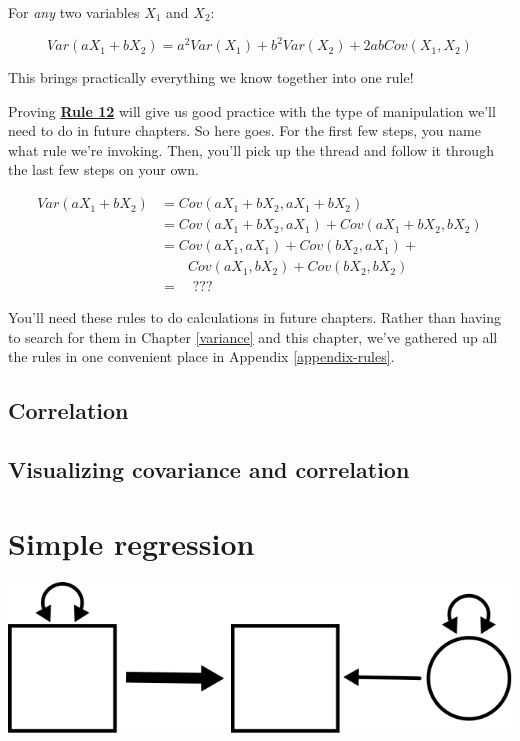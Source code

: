 \documentclass[
]{book}
\begin{document}
For \emph{any} two variables \(X_{1}\) and \(X_{2}\):

\[
Var(aX_{1} + bX_{2}) = 
    a^2Var(X_{1}) + b^2Var(X_{2}) + 2abCov(X_{1}, X_{2})
\]

This brings practically everything we know together into one rule!

Proving \protect\hyperlink{Rule12}{\textbf{Rule 12}} will give us good practice with the type of manipulation we'll need to do in future chapters. So here goes. For the first few steps, you name what rule we're invoking. Then, you'll pick up the thread and follow it through the last few steps on your own.

\begin{align}
Var(aX_{1} + bX_{2}) &= Cov(aX_{1} + bX_{2}, aX_{1} + bX_{2}) \\
    &= Cov(aX_{1} + bX_{2}, aX_{1}) + Cov(aX_{1} + bX_{2}, bX_{2}) \\
    &=  Cov(aX_{1}, aX_{1}) + 
        Cov(bX_{2}, aX_{1}) + \\
    &   \qquad Cov(aX_{1}, bX_{2}) + 
        Cov(bX_{2}, bX_{2}) \\
    &= \quad ???
\end{align}

You'll need these rules to do calculations in future chapters. Rather than having to search for them in Chapter \ref{variance} and this chapter, we've gathered up all the rules in one convenient place in Appendix \ref{appendix-rules}.

\hypertarget{covariance-correlation}{%
\section{Correlation}\label{covariance-correlation}}

\hypertarget{covariance-visualizing}{%
\section{Visualizing covariance and correlation}\label{covariance-visualizing}}

\hypertarget{simple}{%
\chapter{Simple regression}\label{simple}}

\begin{center}\includegraphics{graphics/simple_regression} \end{center}
\end{document}
